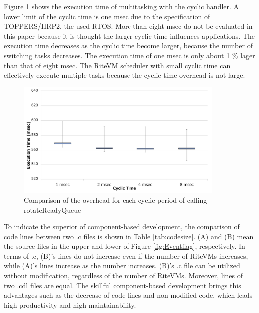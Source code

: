 \documentclass[a4j,12pt,oneside,openany,english]{jsbook}
\begin{document}
Figure \ref{fig:comparison_msec} shows the execution time of multitasking with the cyclic handler.
A lower limit of the cyclic time is one msec due to the specification of TOPPERS/HRP2, the used RTOS.
More than eight msec do not be evaluated in this paper because it is thought the larger cyclic time influences applications.
The execution time decreases as the cyclic time become larger, because the number of switching tasks decreases.
The execution time of one msec is only about 1 \% lager than that of eight msec.
The RiteVM scheduler with small cyclic time can effectively execute multiple tasks because the cyclic time overhead is not large.

\begin{figure}[t]
    \centering
    \includegraphics[width=10cm,clip]{../EMSOFT2016/figure/comparison_msec.pdf}
    \caption{Comparison of the overhead for each cyclic period of calling rotateReadyQueue}
    \label{fig:comparison_msec}
\end{figure}

To indicate the superior of component-based development, the comparison of code lines between two .c files is shown in Table \ref{tab:codesize}.
(A) and (B) mean the source files in the upper and lower of Figure \ref{fig:Eventflag}, respectively. 
In terms of .c, (B)'s lines do not increase even if the number of RiteVMs increases, while (A)'s lines increase as the number increases.
(B)'s .c file can be utilized without modification, regardless of the number of RiteVMs.
Moreover, lines of two .cdl files are equal.
The skillful component-based development brings this advantages such as the decrease of code lines and non-modified code, which leads high productivity and high maintainability.
\end{document}

